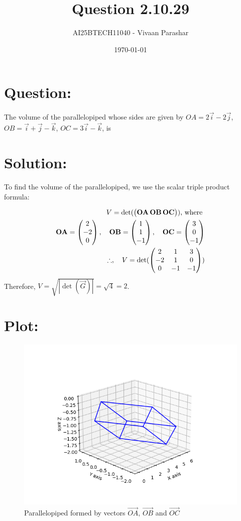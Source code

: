 \documentclass[a4paper, 12pt]{article}
\title{Question 2.10.29}
\author{AI25BTECH11040 - Vivaan Parashar}
\date{\today}
\begin{document}
\maketitle

\section{Question: }
The volume of the parallelopiped whose sides are given by $\textit{OA} = 2\vec{i}-2\vec{j}$, $\textit{OB} = \vec{i}+\vec{j}-\vec{k}$, $\textit{OC} = 3\vec{i} - \vec{k}$, is

\section{Solution: }
To find the volume of the parallelopiped, we use the scalar triple product formula:

\begin{align}
    V = \det(\begin{pmatrix}\mathbf{OA}\, \mathbf{OB}\, \mathbf{OC}\end{pmatrix})\text{, where }\\
    \mathbf{OA} = \begin{pmatrix}2      \\ -2 \\ 0\end{pmatrix}, \quad
    \mathbf{OB} = \begin{pmatrix}1      \\ 1 \\ -1\end{pmatrix}, \quad
    \mathbf{OC} = \begin{pmatrix}3      \\ 0 \\ -1\end{pmatrix}\\
    \therefore, \quad V = \det(\begin{pmatrix}2 & 1 & 3 \\ -2 & 1 & 0 \\ 0 & -1 & -1\end{pmatrix})
\end{align}
Therefore, $V = \sqrt{|\det(\vec{G})|} = \sqrt{4} = 2$.

\section{Plot: }
\begin{figure}[h!]
    \centering
    \includegraphics[width=\columnwidth]{figs/plot.png}
    \caption{Parallelopiped formed by vectors $\vec{OA}$, $\vec{OB}$ and $\vec{OC}$}
    \label{fig:2.10.29}
\end{figure}
\end{document}
